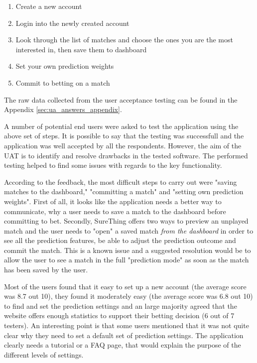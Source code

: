 \begin{enumerate}
  \item Create a new account
  \item Login into the newly created account
  \item Look through the list of matches and choose the ones you are the most interested in, then save them to dashboard
  \item Set your own prediction weights
  \item Commit to betting on a match
\end{enumerate}

The raw data collected from the user acceptance testing can be found in the Appendix \ref{sec:ua_answers_appendix}.

A number of potential end users were asked to test the application using the above set of steps. It is possible to say that the testing was successfull and the application was well accepted by all the respondents. However, the aim of the UAT is to identify and resolve drawbacks in the tested software. The performed testing helped to find some issues with regards to the key functionality.

According to the feedback, the most difficult steps to carry out were "saving matches to the dashboard," "committing a match" and "setting own prediction weights". First of all, it looks like the application needs a better way to communicate, why a user needs to save a match to the dashboard before committing to bet. Secondly, SureThing offers two ways to preview an unplayed match and the user needs to "open" a saved match \emph{from the dashboard} in order to see all the prediction features, be able to adjust the prediction outcome and commit the match. This is a known issue and a suggested resolution would be to allow the user to see a match in the full "prediction mode" as soon as the match has been saved by the user.

Most of the users found that it easy to set up a new account (the average score was 8.7 out 10), they found it moderately easy (the average score was 6.8 out 10) to find and set the prediction settings and an large majority agreed that the website offers enough statistics to support their betting decision (6 out of 7 testers). An interesting point is that some users mentioned that it was not quite clear why they need to set a default set of prediction settings. The application clearly needs a tutorial or a FAQ page, that would explain the purpose of the different levels of settings.

